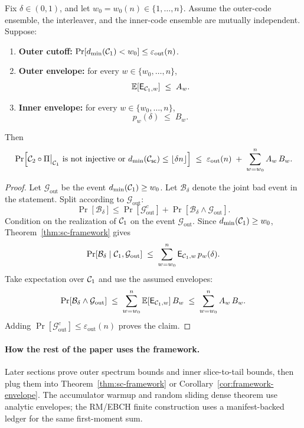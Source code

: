 \begin{corollary}
\label{cor:framework-envelope}
Fix \(\delta\in(0,1)\), and let \(w_0=w_0(n)\in\{1,\dots,n\}\).
Assume the outer-code ensemble, the interleaver, and the inner-code ensemble are mutually independent.
Suppose:
\begin{enumerate}
\item \textbf{Outer cutoff:} \(\Pr[d_{\min}({\mathcal{C}_1})< w_0]\le \varepsilon_{\mathrm{out}}(n)\).
\item \textbf{Outer envelope:} for every \(w\in\{w_0,\dots,n\}\),
\[
\mathbb{E}[\mathsf{E}_{{\mathcal{C}_1},w}] \;\le\; A_w.
\]
\item \textbf{Inner envelope:} for every \(w\in\{w_0,\dots,n\}\),
\[
p_w(\delta)\;\le\; B_w.
\]
\end{enumerate}
Then
\[
\Pr\Bigl[
 {\mathcal{C}_2}\circ\Pi\big|_{{\mathcal{C}_1}}\text{ is not injective}
 \ \text{or}\ d_{\min}({\mathcal{C}_{\mathsf{sc}}})\le \lfloor\delta n\rfloor
\Bigr]
\;\le\;
\varepsilon_{\mathrm{out}}(n)\;+\;\sum_{w=w_0}^{n} A_w\,B_w.
\]
\end{corollary}

\begin{proof}
Let \(\mathcal{G}_{\mathrm{out}}\) be the event \(d_{\min}({\mathcal{C}_1})\ge w_0\).
Let \(\mathcal B_\delta\) denote the joint bad event in the statement.  Split
according to \(\mathcal{G}_{\mathrm{out}}\):
\[
 \Pr[\mathcal B_\delta]
 \le \Pr[\mathcal{G}_{\mathrm{out}}^{c}]
     +\Pr[\mathcal B_\delta\wedge\mathcal{G}_{\mathrm{out}}].
\]
Condition on the realization of \({\mathcal{C}_1}\) on the event \(\mathcal{G}_{\mathrm{out}}\).
Since \(d_{\min}({\mathcal{C}_1})\ge w_0\), Theorem~\ref{thm:sc-framework} gives
\[
\Pr[\mathcal B_\delta\mid{\mathcal{C}_1},\mathcal{G}_{\mathrm{out}}]
\;\le\;
\sum_{w=w_0}^{n}\mathsf{E}_{{\mathcal{C}_1},w}\,p_w(\delta).
\]
Take expectation over \({\mathcal{C}_1}\) and use the assumed envelopes:
\[
\Pr[\mathcal B_\delta\wedge\mathcal{G}_{\mathrm{out}}]
\;\le\;
\sum_{w=w_0}^{n}\mathbb{E}[\mathsf{E}_{{\mathcal{C}_1},w}]\,B_w
\;\le\;
\sum_{w=w_0}^{n}A_w\,B_w.
\]
Adding \(\Pr[\mathcal{G}_{\mathrm{out}}^{c}]\le \varepsilon_{\mathrm{out}}(n)\) proves the claim.
\end{proof}

\paragraph{How the rest of the paper uses the framework.}
Later sections prove outer spectrum bounds and inner slice-to-tail bounds, then plug them into
Theorem~\ref{thm:sc-framework} or Corollary~\ref{cor:framework-envelope}.  The accumulator warmup and random sliding
dense theorem use analytic envelopes; the RM/EBCH finite construction uses a manifest-backed ledger for the same
first-moment sum.
